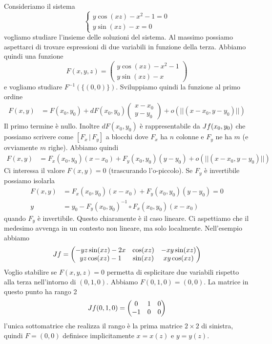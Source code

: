 \documentclass[a4paper]{article}
\begin{document}
\begin{radioactive}
Consideriamo il sistema
\[
    \begin{cases}
        y\cos(xz) - x^2 - 1 = 0 \\
        y\sin(xz) - x = 0
    \end{cases}
\]
vogliamo studiare l'insieme delle soluzioni del sistema.
Al massimo possiamo aspettarci di trovare espressioni di due variabili
in funzione della terza.
Abbiamo quindi una funzione
\[
    F(x,y,z) = \begin{pmatrix}
        y\cos(xz) - x^2 - 1 \\
        y\sin(xz) - x
    \end{pmatrix}
\]
e vogliamo studiare \(F^{-1}(\{(0,0)\})\).
Sviluppiamo quindi la funzione al primo ordine
\begin{align*}
    F(x,y) &= F(x_0, y_0)
    + dF(x_0, y_0) \begin{pmatrix}x-x_0 \\ y - y_0\end{pmatrix} + o(||(x-x_0, y-y_0)||)
\end{align*}
Il primo termine è nullo.
Inoltre \(dF(x_0, y_0)\) è rappresentabile da \(J f(x_0, y_0)\)
che possiamo scrivere come \([F_x \,|\, F_y]\) a blocchi
dove \(F_x\) ha \(n\) colonne e \(F_y\) ne ha \(m\) (e ovviamente \(m\) righe).
Abbiamo quindi
\begin{align*}
    F(x,y) &= F_x(x_0, y_0)(x-x_0)
    + F_y(x_0, y_0)(y-y_0) + o(||(x-x_0, y-y_0)||)
\end{align*}
Ci interessa il valore \(F(x,y)=0\) (trascurando l'o-piccolo).
Se \(F_y\) è invertibile possiamo isolarla
\begin{align*}
    F(x,y) &= F_x(x_0, y_0)(x-x_0)
    + F_y(x_0, y_0)(y-y_0) = 0 \\
    y &= y_0 - F_y(x_0, y_0)^{-1} \circ F_x(x_0, y_0)(x-x_0)
\end{align*}
quando \(F_y\) è invertibile.
Questo chiaramente è il caso lineare. Ci aspettiamo che il medesimo
avvenga in un contesto non lineare, ma solo localmente.
Nell'esempio abbiamo
\[
    J f = \begin{pmatrix}
        -yz\sin(xz)-2x & \cos(xz) & -xy\sin(xz) \\
        yz\cos(xz) - 1 & \sin(xz) & xy\cos(xz)
    \end{pmatrix}
\]
Voglio stabilire se \(F(x,y,z) = 0\) permetta di esplicitare due variabili rispetto alla terza
nell'intorno di \((0,1,0)\). Abbiamo \(F(0,1,0) = (0,0)\).
La matrice in questo punto ha rango 2
\[
    J f(0,1,0) = \begin{pmatrix}
        0 & 1 & 0 \\ -1 & 0 & 0
    \end{pmatrix}
\]
l'unica sottomatrice che realizza il rango è
la prima matrice \(2\times 2\) di sinistra, quindi
\(F=(0,0)\) definisce implicitamente \(x=x(z)\) e \(y=y(z)\).
\end{radioactive}
\end{document}
